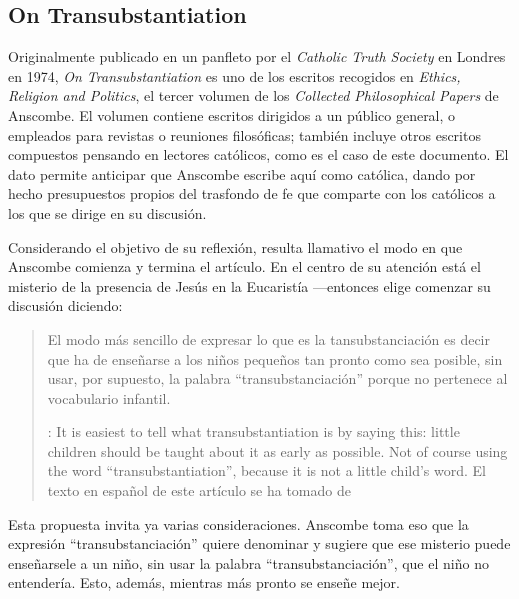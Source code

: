 \subsection{On Transubstantiation}

Originalmente publicado en un panfleto por el \emph{Catholic Truth Society} en Londres en 1974, \emph{On Transubstantiation} es uno de los escritos recogidos en \emph{Ethics, Religion and Politics}, el tercer volumen de los \emph{Collected Philosophical Papers} de Anscombe. El volumen contiene escritos dirigidos a un público general, o empleados para revistas o reuniones filosóficas; también incluye otros escritos compuestos pensando en lectores católicos, como es el caso de este documento. El dato permite anticipar que Anscombe escribe aquí como católica, dando por hecho presupuestos propios del trasfondo de fe que comparte con los católicos a los que se dirige en su discusión.

Considerando el objetivo de su reflexión, resulta llamativo el modo en que Anscombe comienza y termina el artículo. En el centro de su atención está el misterio de la presencia de Jesús en la Eucaristía ---entonces elige comenzar su discusión diciendo: \blockquote[{\cite[108]{anscombe1981erp:ot}}: It is easiest to tell what transubstantiation is by saying this: little children should be taught about it as early as possible. Not of course using the word ``transubstantiation'', because it is not a little child's word. El texto en español de este artículo se ha tomado de {\cite{torralbaynubiola2005fayeh:ot}}]{El modo más sencillo de expresar lo que es la tansubstanciación es decir que ha de enseñarse a los niños pequeños tan pronto como sea posible, sin usar, por supuesto, la palabra ``transubstanciación'' porque no pertenece al vocabulario infantil.} Esta propuesta invita ya varias consideraciones. Anscombe toma eso que la expresión \enquote{transubstanciación} quiere denominar y sugiere que ese misterio puede enseñarsele a un niño, sin usar la palabra \enquote{transubstanciación}, que el niño no entendería. Esto, además, mientras más pronto se enseñe mejor.

